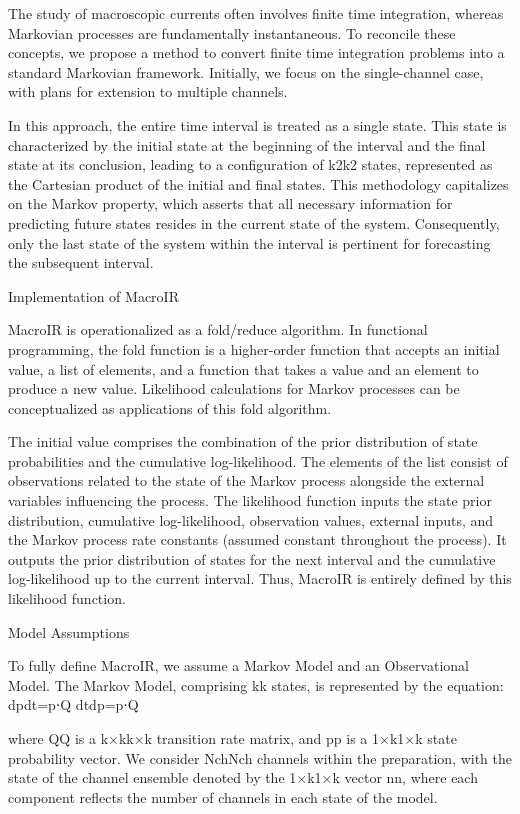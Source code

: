 \documentclass[pdflatex,sn-mathphys-num]{sn-jnl}%
\theoremstyle{thmstyleone}%
\theoremstyle{thmstyletwo}%
\theoremstyle{thmstylethree}%
\begin{document}
The study of macroscopic currents often involves finite time integration, whereas Markovian processes are fundamentally instantaneous. To reconcile these concepts, we propose a method to convert finite time integration problems into a standard Markovian framework. Initially, we focus on the single-channel case, with plans for extension to multiple channels.

In this approach, the entire time interval is treated as a single state. This state is characterized by the initial state at the beginning of the interval and the final state at its conclusion, leading to a configuration of k2k2 states, represented as the Cartesian product of the initial and final states. This methodology capitalizes on the Markov property, which asserts that all necessary information for predicting future states resides in the current state of the system. Consequently, only the last state of the system within the interval is pertinent for forecasting the subsequent interval.

Implementation of MacroIR

MacroIR is operationalized as a fold/reduce algorithm. In functional programming, the fold function is a higher-order function that accepts an initial value, a list of elements, and a function that takes a value and an element to produce a new value. Likelihood calculations for Markov processes can be conceptualized as applications of this fold algorithm.

The initial value comprises the combination of the prior distribution of state probabilities and the cumulative log-likelihood. The elements of the list consist of observations related to the state of the Markov process alongside the external variables influencing the process. The likelihood function inputs the state prior distribution, cumulative log-likelihood, observation values, external inputs, and the Markov process rate constants (assumed constant throughout the process). It outputs the prior distribution of states for the next interval and the cumulative log-likelihood up to the current interval. Thus, MacroIR is entirely defined by this likelihood function.

Model Assumptions

To fully define MacroIR, we assume a Markov Model and an Observational Model. The Markov Model, comprising kk states, is represented by the equation:
dpdt=p⋅Q
dtdp​=p⋅Q

where QQ is a k×kk×k transition rate matrix, and pp is a 1×k1×k state probability vector. We consider NchNch​ channels within the preparation, with the state of the channel ensemble denoted by the 1×k1×k vector nn, where each component reflects the number of channels in each state of the model.
\end{document}
